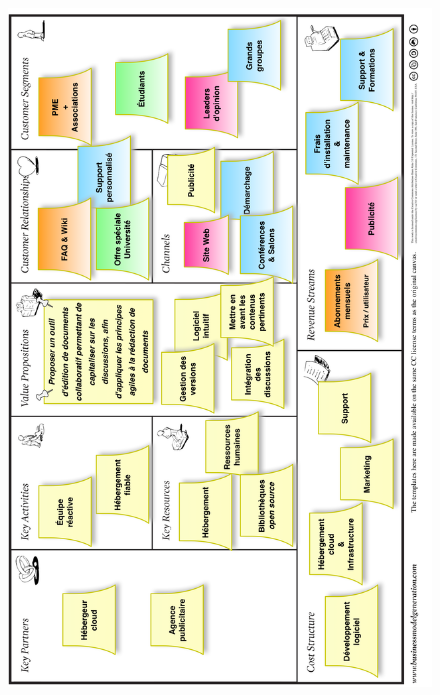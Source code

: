 \documentclass[10pt,twocolumn,a4paper,utf8x]{article}
\begin{document}
\begin{figure}[htbp]
\centering
\includegraphics[width=\hsize]{business_model_canvas.png}
\end{figure}

\end{document}
